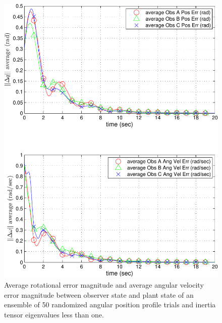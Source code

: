 \begin{center}
\begin{figure}[htbp]
  \begin{center}
    \includegraphics[width=150mm]{./chSMS_ID/images/allObsAvgErr}
  \end{center}
  \caption{Average rotational error magnitude and average angular
    velocity error magnitude between observer state and plant state of
    an ensemble of 50 randomized angular position profile trials and
    inertia tensor eigenvalues less than one.}
  \label{chSMS_ID.fig.AVO_avgNorm2}
\end{figure}
\end{center}



